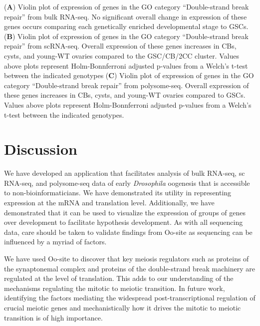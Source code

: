 \documentclass[12pt,oneside]{reedthesis}
\begin{document}
\setlength\parindent{0pt}(\textbf{A}) Violin plot of expression of genes in the GO category ``Double-strand break repair'' from bulk RNA-seq. No significant overall change in expression of these genes occurs comparing each genetically enriched developmental stage to GSCs. (\textbf{B}) Violin plot of expression of genes in the GO category ``Double-strand break repair'' from scRNA-seq. Overall expression of these genes increases in CBs, cysts, and young-WT ovaries compared to the GSC/CB/2CC cluster. Values above plots represent Holm-Bonnferroni adjusted p-values from a Welch's t-test between the indicated genotypes (\textbf{C}) Violin plot of expression of genes in the GO category ``Double-strand break repair'' from polysome-seq. Overall expression of these genes increases in CBs, cysts, and young-WT ovaries compared to GSCs. Values above plots represent Holm-Bonnferroni adjusted p-values from a Welch's t-test between the indicated genotypes.


\hypertarget{discussion-1}{%
\section{Discussion}\label{discussion-1}}

We have developed an application that facilitates analysis of bulk
RNA-seq, sc RNA-seq, and polysome-seq data of early \emph{Drosophila}
oogenesis that is accessible to non-bioinformaticians. We have
demonstrated its utility in representing expression at the mRNA and
translation level. Additionally, we have demonstrated that it can be
used to visualize the expression of groups of genes over development to
facilitate hypothesis development. As with all sequencing data, care
should be taken to validate findings from Oo-site as sequencing can be
influenced by a myriad of factors.

We have used Oo-site to discover that key meiosis regulators such as
proteins of the synaptonemal complex and proteins of the double-strand
break machinery are regulated at the level of translation. This adds to
our understanding of the mechanisms regulating the mitotic to meiotic
transition. In future work, identifying the factors mediating the
widespread post-transcriptional regulation of crucial meiotic genes and
mechanistically how it drives the mitotic to meiotic transition is of
high importance.
\end{document}
